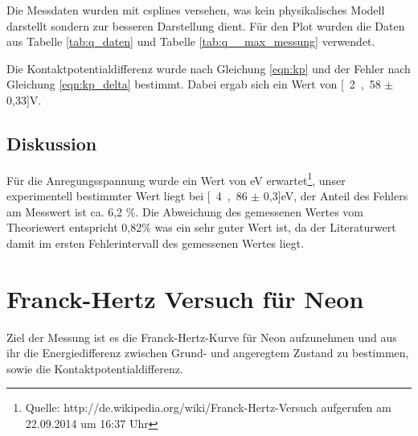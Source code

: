 \documentclass[12pt,a4paper]{article}
\begin{document}
Die Messdaten wurden mit csplines versehen, was kein physikalisches Modell darstellt sondern zur besseren Darstellung dient. Für den Plot wurden die Daten aus Tabelle \ref{tab:q_daten} und Tabelle \ref{tab:q__max_messung} verwendet.

Die Kontaktpotentialdifferenz wurde nach Gleichung \ref{eqn:kp} und
der Fehler nach Gleichung \ref{eqn:kp_delta}  bestimmt. Dabei ergab sich ein Wert von \unit[2,58 $\pm$ 0,33]{V}.

\subsection{Diskussion}

Für die Anregungsspannung wurde ein Wert von \unit[4,9]{eV} erwartet\footnote{Quelle: http://de.wikipedia.org/wiki/Franck-Hertz-Versuch aufgerufen am 22.09.2014 um 16:37 Uhr}, unser experimentell bestimmter Wert liegt bei \unit[4,86 $\pm$ 0,3]{eV}, der Anteil des Fehlers am Messwert ist ca. 6,2 \%. Die Abweichung des gemessenen Wertes vom Theoriewert entspricht 0,82\% was ein sehr guter Wert ist, da der Literaturwert damit im ersten Fehlerintervall des gemessenen Wertes liegt.

\section{Franck-Hertz Versuch für Neon}
Ziel der Messung ist es die Franck-Hertz-Kurve für Neon aufzunehmen und aus ihr die Energiedifferenz zwischen Grund- und angeregtem Zustand zu bestimmen, sowie die Kontaktpotentialdifferenz.
\end{document}
